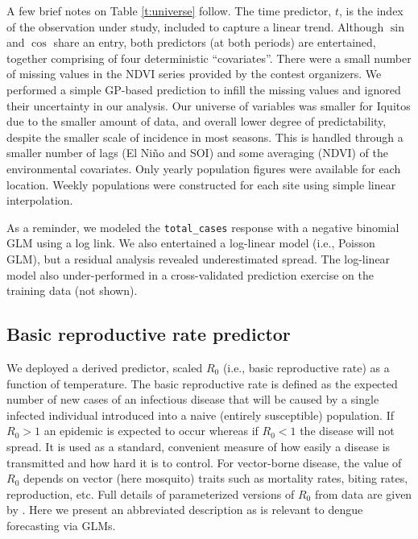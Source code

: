 \documentclass[12pt]{article}
\begin{document}
A few brief notes on Table \ref{t:universe} follow.  The time predictor, $t$,
is the index of the observation under study, included to capture a linear
trend.  Although $\sin$ and $\cos$ share an entry, both predictors (at both
periods) are entertained, together comprising of four deterministic
``covariates''.  There were a small number of missing values in the NDVI
series provided by the contest organizers.  We performed a simple GP-based
prediction to infill the missing values and ignored their uncertainty in our
analysis.  Our universe of variables was smaller for Iquitos due to the
smaller amount of data, and overall lower degree of predictability, despite
the smaller scale of incidence in most seasons.  This is handled through a
smaller number of lags (El Ni\~no and SOI) and some averaging (NDVI) of the
environmental covariates.  Only yearly population figures were available for
each location. Weekly populations were constructed for each site using simple
linear interpolation.

As a reminder, we modeled the
\verb!total_cases! response with a negative binomial GLM using a log link.  We
also entertained a log-linear model (i.e., Poisson GLM), but a
residual analysis revealed underestimated spread.  The log-linear model also
under-performed in a cross-validated prediction exercise on the training data (not
shown).


\subsection{Basic reproductive rate predictor}
\label{sec:R0}

We deployed a derived predictor, scaled $R_0$ (i.e., basic reproductive rate)
as a function of temperature. The basic reproductive rate is defined as the
expected number of new cases of an infectious disease that will be caused by a
single infected individual introduced into a naive (entirely susceptible) population. If $R_0>1$ an
epidemic is expected to occur whereas if $R_0<1$ the disease will not spread.
It is used as a standard, convenient measure of how easily a disease is
transmitted and how hard it is to control. For vector-borne disease, the value
of $R_0$ depends on vector (here mosquito) traits such as mortality rates,
biting rates, reproduction, etc. Full details of parameterized versions of
$R_0$ from data are given by
\cite{mordecai:etal:2017}. Here we present an abbreviated description as is
relevant to dengue forecasting via GLMs.
\end{document}
